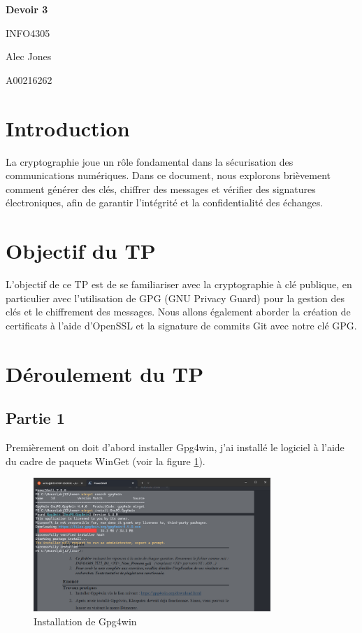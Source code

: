 \documentclass[12pt,a4paper]{article}
\begin{document}
\begin{titlepage}
    \begin{center}
        \vspace*{2cm}
        {\huge\bfseries Devoir 3\par}
        {INFO4305\par}
        \vspace{2cm}
        {\Large Alec Jones\par}
        {\large A00216262\par}
        \vfill
    \end{center}
\end{titlepage}

\tableofcontents
\newpage

\section{Introduction}
La cryptographie joue un rôle fondamental dans la sécurisation des communications numériques.
Dans ce document, nous explorons brièvement comment générer des clés,
chiffrer des messages et vérifier des signatures électroniques, afin de garantir l'intégrité et la confidentialité des échanges.

\section{Objectif du TP}
L'objectif de ce TP est de se familiariser avec la cryptographie à clé publique,
en particulier avec l'utilisation de GPG (GNU Privacy Guard) pour la gestion des clés et le chiffrement des messages.
Nous allons également aborder la création de certificats à l'aide d'OpenSSL et la signature de commits Git avec notre clé GPG.

\newpage
\section{Déroulement du TP}
\subsection{Partie 1}
Premièrement on doit d'abord installer Gpg4win, j'ai installé le logiciel à
l'aide du cadre de paquets WinGet (voir la figure \ref{gpg4win}).

\begin{figure}[h]
    \centering
    \includegraphics[width=0.8\textwidth]{../img/gpg4win.png}
    \caption{Installation de Gpg4win}
    \label{gpg4win}
\end{figure}
\end{document}
